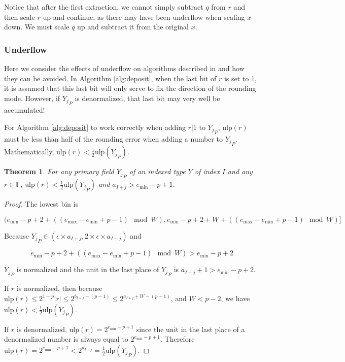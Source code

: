 \documentclass[12pt]{article}
\providecommand{\F}{\ensuremath{\mathbb{F}}}
\providecommand{\min}{\ensuremath{\text{min}}}
\providecommand{\max}{\ensuremath{\text{max}}}
\providecommand{\ulp}{\ensuremath{\text{ulp}}}
\theoremstyle{plain}
\newtheorem{thm}{Theorem}[section]
\numberwithin{equation}{section}
\begin{document}
      Notice that after the first extraction, we cannot simply subtract $q$ from $r$ and then scale $r$ up and continue, as there may have been underflow when scaling $x$ down. We must scale $q$ up and subtract it from the original $x$.

    \subsubsection{Underflow}
      \label{sec:indexed_implementation_underflow}
      Here we consider the effects of underflow on algorithms described in \cite{repsum} and how they can be avoided. In Algorithm \ref{alg:deposit}, when the last bit of $r$ is set to 1, it is assumed that this last bit will only serve to fix the direction of the rounding mode. However, if ${Y_j}_P$ is denormalized, that last bit may very well be accumulated!

      For Algorithm \ref{alg:deposit} to work correctly when adding $r | 1$ to ${Y_j}_P$, $\ulp(r)$ must be less than half of the rounding error when adding a number to ${Y_j}_P$. Mathematically, $\ulp(r) < \frac{1}{2}\ulp({Y_j}_P)$.

      \begin{thm}
        For any primary field ${Y_j}_P$ of an indexed type $Y$ of index $I$ and any $r \in \F$, $\ulp(r) < \frac{1}{2}\ulp({Y_j}_P)$ and $a_{I + j} > e_{\min} - p + 1$.
        \label{thm:underflowulp}
      \end{thm}
      \begin{proof}
      The lowest bin is

      \begin{equation*}
      (e_{\min} - p + 2 + ((e_{\max} - e_{\min} + p - 1 ) \mod W), e_{\min} - p + 2 + W + ((e_{\max} - e_{\min} + p - 1)\mod W)]
      \end{equation*}

      Because ${Y_j}_P \in (\epsilon \times a_{I + j}, 2 \times \epsilon \times a_{I + j})$ and

      \begin{equation*}
      e_{\min} - p + 2 + ((e_{\max} - e_{\min} + p- 1) \mod W) > e_{\min} - p + 2
      \end{equation*}

      ${Y_j}_P$ is normalized and the unit in the last place of ${Y_j}_P$ is $a_{I + j} + 1 > e_{\min} - p + 2$.

      If $r$ is normalized, then because $\ulp(r) \leq 2^{1 - p}|r| \leq 2^{b_{I + j} - (p - 1)} \leq 2^{a_{I + j} + W - (p - 1)}$, and $W < p - 2$, we have $\ulp(r) < \frac{1}{2}\ulp({Y_j}_P)$.

      If $r$ is denormalized, $\ulp(r) = 2^{e_{\min} - p + 1}$ since the unit in the last place of a denormalized number is always equal to $2^{e_{\min} - p + 1}$. Therefore $\ulp(r) = 2^{e_{\min} - p + 1} < 2^{a_{I + j}} = \frac{1}{2}\ulp({Y_j}_P)$.
      \end{proof}
\end{document}
